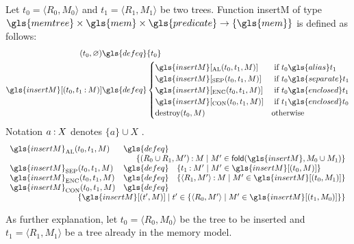 \begin{definition}\label{def:insert}
  Let $t_0 = \langle R_0,M_0\rangle$ and $t_1 = \langle R_1,M_1\rangle$ be two trees. Function
  \gls{insertM} of type $\gls{memtree}\times\gls{mem}\times\gls{predicate}\rightarrow\{\gls{mem}\}$
  is defined as follows:
  \begin{align*}
    (t_0,\varnothing) &\gls{defeq} \{t_0\}\notag \\
    \gls{insertM}[(t_0,t_1\cons M)] &\gls{defeq} \begin{cases}
      \gls{insertM}[_\text{AL}(t_0,t_1,M)] & \text{ if } t_0\gls{alias}t_1 \\
      \gls{insertM}[_\text{SEP}(t_0,t_1,M)] & \text{ if } t_0\gls{separate}t_1 \\
      \gls{insertM}[_\text{ENC}(t_0,t_1,M)] & \text{ if } t_0\gls{enclosed}t_1 \\
      \gls{insertM}[_\text{CON}(t_0,t_1,M)] & \text{ if } t_1\gls{enclosed}t_0 \\
      \mbox{destroy}(t_0, M)  & \text{otherwise}
    \end{cases}
  \end{align*}
  Notation $a \mathbin{:} X$ denotes $\{a\} \cup X$ .
  \begin{equation*}
    \begin{array}{lcl}
      \gls{insertM}_\text{AL}(t_0,t_1,M) &\gls{defeq}& \\
      \multicolumn{3}{r}{\{(R_0\cup R_1, M') \cons M \mid M' \in \mathsf{fold}(\gls{insertM}, M_0 \cup M_1) \}} \\
      \gls{insertM}_\text{SEP}(t_0,t_1,M) &\gls{defeq}& \{t_1\cons M'\mid M'\in\gls{insertM}[(t_0,M)]\} \\
      \gls{insertM}_\text{ENC}(t_0,t_1,M) &\gls{defeq}& \{\langle R_1,M'\rangle\cons M\mid M'\in\gls{insertM}[(t_0,M_1)]\} \\
      \gls{insertM}_\text{CON}(t_0,t_1,M) &\gls{defeq}& \\
      \multicolumn{3}{r}{ \{\gls{insertM}[(t',M)]\mid t'\in\{\langle R_0,M'\rangle\mid M'\in \gls{insertM}[(t_1,M_0)]\}\}}
    \end{array}
  \end{equation*}
\end{definition}
As further explanation, let $t_0 = \langle R_0,M_0\rangle$ be the tree to be inserted and $t_1 = \langle R_1,M_1\rangle$ be a tree already in the memory model.
